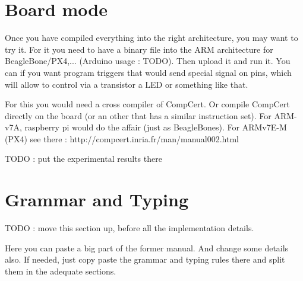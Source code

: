 \documentclass[11pt]{article}
\begin{document}
\section{Board mode}

Once you have compiled everything into the right architecture, you may want to try it. For it you need to have a binary file into the ARM architecture for BeagleBone/PX4,... (Arduino usage : TODO). Then upload it and run it. You can if you want program triggers that would send special signal on pins, which will allow to control via a transistor a LED or something like that. 

For this you would need a cross compiler of CompCert. Or compile CompCert directly on the board (or an other that has a similar instruction set). For ARM-v7A, raspberry pi would do the affair (just as BeagleBones). For ARMv7E-M (PX4) see there : http://compcert.inria.fr/man/manual002.html

TODO : put the experimental results there

\section{Grammar and Typing}
TODO : move this section up, before all the implementation details.

Here you can paste a big part of the former manual. And change some details also.
If needed, just copy paste the grammar and typing rules there and split them in the adequate sections.



\end{document}
